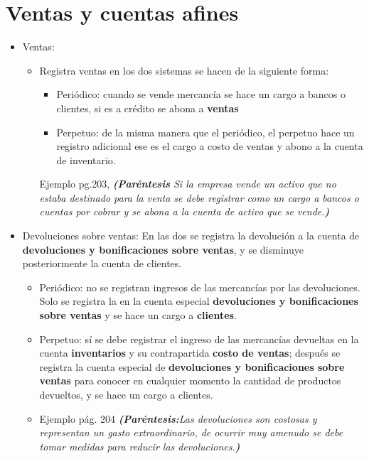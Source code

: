\documentclass{article}
\begin{document}
\section{Ventas y cuentas afines}
\begin{itemize}
    \item Ventas:
    \begin{itemize}
        \item Registra ventas en los dos sistemas se hacen de la siguiente forma: 
        \begin{itemize}
            \item Periódico: cuando se vende mercancía se hace un cargo a bancos o clientes, si es a crédito se abona a \textbf{ventas}
            \item Perpetuo: de la misma manera que el periódico, el perpetuo hace un registro adicional ese es el cargo a costo de ventas y abono a la cuenta de inventario. 
        \end{itemize}
        Ejemplo pg.203, \emph{\textbf{(Paréntesis} Si la empresa vende un activo que no estaba destinado para la venta se debe registrar como un cargo a bancos o cuentas por cobrar y se abona a la cuenta de activo que se vende.\textbf{)}}
    \end{itemize}
    
    \item Devoluciones sobre ventas: En las dos se registra la devolución a la cuenta de \textbf{devoluciones y bonificaciones sobre ventas}, y se disminuye posteriormente la cuenta de clientes.
    \begin{itemize}
        \item Periódico: no se registran ingresos de las mercancías por las devoluciones. Solo se registra la en la cuenta especial \textbf{devoluciones y bonificaciones sobre ventas} y se hace un cargo a \textbf{clientes}.
        \item Perpetuo: sí se debe registrar el ingreso de las mercancías devueltas en la cuenta \textbf{inventarios} y su contrapartida \textbf{costo de ventas}; después se registra la cuenta especial de \textbf{devoluciones y bonificaciones sobre ventas} para conocer en cualquier momento la cantidad de productos devueltos, y se hace un cargo a clientes. 
        \item Ejemplo pág. 204 \emph{\textbf{(Paréntesis:}Las devoluciones son costosas y representan un gasto extraordinario, de ocurrir muy amenudo se debe tomar medidas para reducir las devoluciones.\textbf{)}} 
    \end{itemize}
        

\end{itemize}
\end{document}
